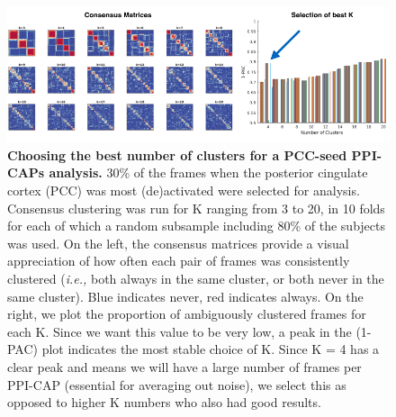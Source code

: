 

\begin{figure}[h]
\centering
\includegraphics[width=1\textwidth]{images/Appendix/Appendix_Ch5_PCC_K.png}
\caption{\textbf{Choosing the best number of clusters for a PCC-seed PPI-CAPs analysis.} 30\% of the frames when the posterior cingulate cortex (PCC) was most (de)activated were selected for analysis. Consensus clustering was run for K ranging from 3 to 20, in 10 folds for each of which a random subsample including 80\% of the subjects was used. On the left, the consensus matrices provide a visual appreciation of how often each pair of frames was consistently clustered (\textit{i.e.,} both always in the same cluster, or both never in the same cluster). Blue indicates never, red indicates always. On the right, we plot the proportion of ambiguously clustered frames for each K. Since we want this value to be very low, a peak in the (1-PAC) plot indicates the most stable choice of K. Since K = 4 has a clear peak and means we will have a large number of frames per PPI-CAP (essential for averaging out noise), we select this as opposed to higher K numbers who also had good results.}
\label{fig:app_pcc_k}
\end{figure}


